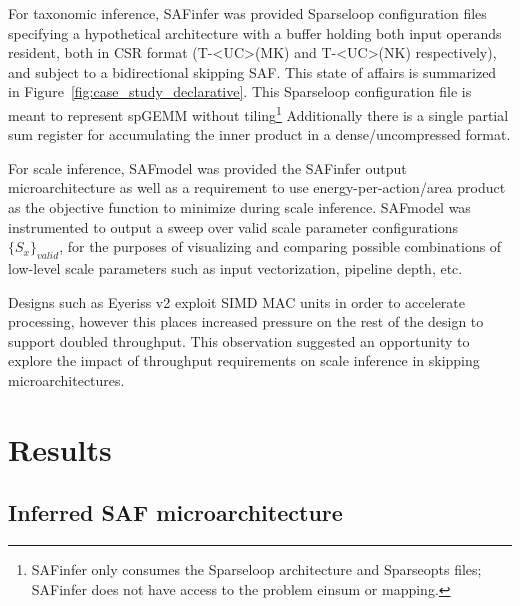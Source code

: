 For taxonomic inference, SAFinfer was provided Sparseloop configuration files specifying a hypothetical architecture with a buffer holding both input operands resident, both in CSR format (T-<UC>(MK) and T-<UC>(NK) respectively), and subject to a bidirectional skipping SAF. This state of affairs is summarized in Figure~\ref{fig:case_study_declarative}. This Sparseloop configuration file is meant to represent spGEMM without tiling\footnote{SAFinfer only consumes the Sparseloop architecture and Sparseopts files; SAFinfer does not have access to the problem einsum or mapping\cite{sparseloop}.} Additionally there is a single partial sum register for accumulating the inner product in a dense/uncompressed format.

For scale inference, SAFmodel was provided the SAFinfer output microarchitecture as well as a requirement to use energy-per-action/area product as the objective function to minimize during scale inference. SAFmodel was instrumented to output a sweep over valid scale parameter configurations $\{S_x\}_{valid}$, for the purposes of visualizing and comparing possible combinations of low-level scale parameters such as input vectorization, pipeline depth, etc.

Designs such as Eyeriss v2\cite{eyerissv2} exploit SIMD MAC units in order to accelerate processing, however this places increased pressure on the rest of the design to support doubled throughput. This observation suggested an opportunity to explore the impact of throughput requirements on scale inference in skipping microarchitectures.

\section{Results}

\subsection{Inferred SAF microarchitecture}

